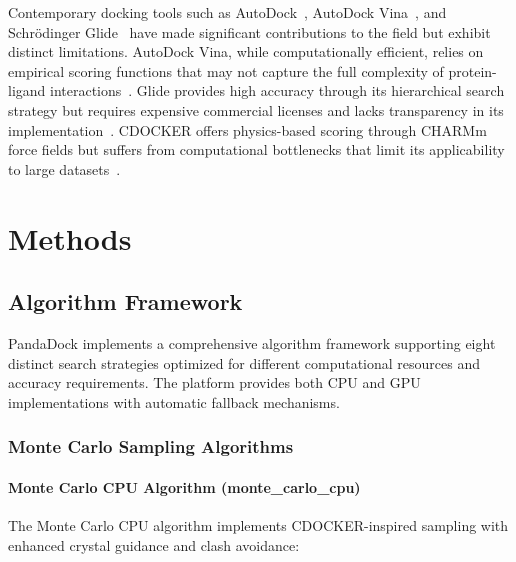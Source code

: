 \documentclass[11pt,a4paper]{article}
\begin{document}
Contemporary docking tools such as AutoDock~\cite{morris2009autodock4}, AutoDock Vina~\cite{trott2010autodock}, and Schrödinger Glide~\cite{friesner2004glide} have made significant contributions to the field but exhibit distinct limitations. AutoDock Vina, while computationally efficient, relies on empirical scoring functions that may not capture the full complexity of protein-ligand interactions~\cite{pagadala2017software}. Glide provides high accuracy through its hierarchical search strategy but requires expensive commercial licenses and lacks transparency in its implementation~\cite{halgren2004glide}. CDOCKER offers physics-based scoring through CHARMm force fields but suffers from computational bottlenecks that limit its applicability to large datasets~\cite{wu2003detailed}.

\section{Methods}

\subsection{Algorithm Framework}

PandaDock implements a comprehensive algorithm framework supporting eight distinct search strategies optimized for different computational resources and accuracy requirements. The platform provides both CPU and GPU implementations with automatic fallback mechanisms.

\subsubsection{Monte Carlo Sampling Algorithms}

\paragraph{Monte Carlo CPU Algorithm (monte\_carlo\_cpu)}

The Monte Carlo CPU algorithm implements CDOCKER-inspired sampling with enhanced crystal guidance and clash avoidance:
\end{document}
